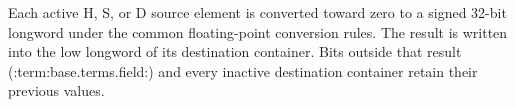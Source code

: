 Each active H, S, or D source element is converted toward zero to a signed
32-bit longword under the common floating-point conversion rules. The result
is written into the low longword of its destination container. Bits outside
that result (:term:base.terms.field:) and every inactive destination container retain their
previous values.
